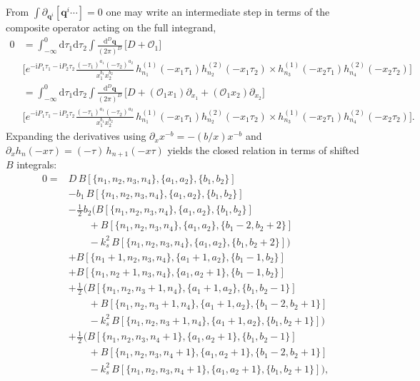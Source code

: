 \documentclass[a4paper,12pt]{article}
\newcommand{\FR}[2]{\displaystyle\frac{\,{#1}\,}{#2}}
\def\di{{\mathrm{d}}}
\def\pd{\partial}
\def\ii{\mathrm{i}}
\begin{document}
From $\int \pd_{\bm q^i}[\bm q^i \cdots ]=0$ one may write an intermediate step in terms of the composite operator acting on the full integrand,
\begin{align}
	0 &= \int_{-\infty}^0 \di\tau_1\di\tau_2\int \FR{\di^D \bm q}{(2\pi)^D}\,
	\Big[D+\mathcal{O}_1\Big] \nonumber\\ 
	& \Bigg[
	e^{-\ii P_1\tau_1-\ii P_2\tau_2}
	\frac{(-\tau_1)^{a_1}(-\tau_2)^{a_2}}{x_1^{b_1}x_2^{b_2}}\,
	h_{n_1}^{(1)}(-x_1\tau_1)h_{n_2}^{(2)}(-x_1\tau_2) \times h_{n_3}^{(1)}(-x_2\tau_1)h_{n_4}^{(2)}(-x_2\tau_2)\Bigg] \nonumber\\
	& =  \int_{-\infty}^0 \di\tau_1\di\tau_2\int \FR{\di^D \bm q}{(2\pi)^D}\,
	\Bigg[D+(\mathcal{O}_1 x_1)\partial_{x_1} +(\mathcal{O}_1 x_2)\partial_{x_2}\Bigg] \nonumber\\
	&\Bigg[
	e^{-\ii P_1\tau_1-\ii P_2\tau_2}
	\frac{(-\tau_1)^{a_1}(-\tau_2)^{a_2}}{x_1^{b_1}x_2^{b_2}}\,
	h_{n_1}^{(1)}(-x_1\tau_1)h_{n_2}^{(2)}(-x_1\tau_2)
	  \times h_{n_3}^{(1)}(-x_2\tau_1)h_{n_4}^{(2)}(-x_2\tau_2)\Bigg]. \label{eq:momIBP_qdot_chainrule}
\end{align}
Expanding the derivatives using $\partial_x x^{-b}=-(b/x)x^{-b}$ and $\partial_x h_n(-x\tau)=(-\tau)\,h_{n+1}(-x\tau)$ yields the closed relation in terms of shifted $B$ integrals:
\begin{align}
	0 ={}& D\,B[\{n_1,n_2,n_3,n_4\},\{a_1,a_2\},\{b_1,b_2\}] \nonumber\\
	&- b_1\,B[\{n_1,n_2,n_3,n_4\},\{a_1,a_2\},\{b_1,b_2\}] \nonumber \\
	&- \FR12 b_2\Big(
	B[\{n_1,n_2,n_3,n_4\},\{a_1,a_2\},\{b_1,b_2\}] \nonumber\\
	&\qquad + B[\{n_1,n_2,n_3,n_4\},\{a_1,a_2\},\{b_1-2,b_2+2\}] \nonumber\\
	&\qquad -k_s^2\,B[\{n_1,n_2,n_3,n_4\},\{a_1,a_2\},\{b_1,b_2+2\}]
	\Big) \nonumber \\
	&+B[\{n_1+1,n_2,n_3,n_4\},\{a_1+1,a_2\},\{b_1-1,b_2\}] \nonumber\\
	&+ B[\{n_1,n_2+1,n_3,n_4\},\{a_1,a_2+1\},\{b_1-1,b_2\}] \nonumber \\
	&+\FR12 \Big(
	B[\{n_1,n_2,n_3+1,n_4\},\{a_1+1,a_2\},\{b_1,b_2-1\}] \nonumber\\
	&\qquad + B[\{n_1,n_2,n_3+1,n_4\},\{a_1+1,a_2\},\{b_1-2,b_2+1\}] \nonumber\\
	&\qquad -k_s^2\,B[\{n_1,n_2,n_3+1,n_4\},\{a_1+1,a_2\},\{b_1,b_2+1\}]
	\Big) \nonumber \\
	&+\FR12\Big(
	B[\{n_1,n_2,n_3,n_4+1\},\{a_1,a_2+1\},\{b_1,b_2-1\}] \nonumber\\
	&\qquad + B[\{n_1,n_2,n_3,n_4+1\},\{a_1,a_2+1\},\{b_1-2,b_2+1\}] \nonumber\\
	&\qquad -k_s^2\,B[\{n_1,n_2,n_3,n_4+1\},\{a_1,a_2+1\},\{b_1,b_2+1\}]
	\Big),
\label{eq:momIBP_qdot}
\end{align}
\end{document}
